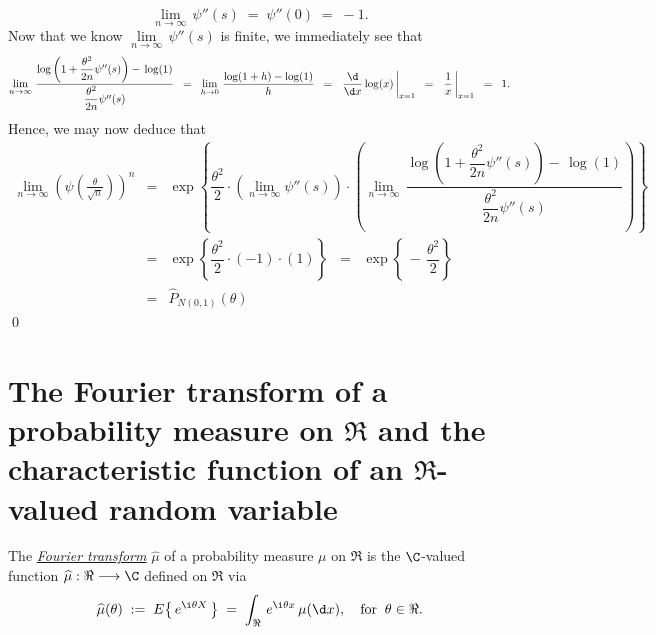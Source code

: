 \documentclass{article}
\begin{document}
\begin{equation*}
\lim_{n\rightarrow\infty}\,\psi''(s) \; = \; \psi''(0) \; = \; -1.
\end{equation*}
Now that we know $\underset{n\rightarrow\infty}{\lim}\,\psi''(s)$ is finite, we immediately see that
\begin{equation*}
\lim_{n\rightarrow\infty}\,\dfrac{\log\left(1+\dfrac{\theta^{2}}{2n}\psi''(s)\right)-\,\log(1)}{\dfrac{\theta^{2}}{2n}\psi''(s)}
\;\; = \;\; \lim_{h\rightarrow 0}\,\dfrac{\log(1+h)-\log(1)}{h}
\;\; = \;\; \left.\dfrac{\d}{\d x}\log(x)\,\right|_{x=1}
\;\; = \;\; \left.\dfrac{1}{x}\,\right|_{x=1}
\;\; = \;\; 1.
\end{equation*}
Hence, we may now deduce that
\begin{eqnarray*}
        \lim_{n\rightarrow\infty}\left(\psi\!\left(\frac{\theta}{\sqrt{n}}\right)\right)^{n}
&=& \exp\left\{\dfrac{\theta^{2}}{2}\cdot\left(\lim_{n\rightarrow\infty}\psi''(s)\right)\cdot\left(\lim_{n\rightarrow\infty}\,\dfrac{\log\left(1+\dfrac{\theta^{2}}{2n}\psi''(s)\right)-\,\log(1)}{\dfrac{\theta^{2}}{2n}\psi''(s)}\right)\right\} \\
&=& \exp\left\{\dfrac{\theta^{2}}{2}\cdot\left(-1\right)\cdot\left(1\right)\right\} 
\;\;=\;\; \exp\left\{\,-\,\dfrac{\theta^{2}}{2}\right\} \\
&=& \widehat{P}_{N(0,1)}(\theta)
\end{eqnarray*}
\qed


\appendix

\section{The Fourier transform of a probability measure on $\Re$ and the characteristic function of an $\Re$-valued random variable}
\setcounter{theorem}{0}

\begin{definition} \mbox{} \vskip 0.1cm \noindent
The \underline{\emph{Fourier transform}} $\widehat{\mu}$ of a probability measure $\mu$ on $\Re$ is the $\C$-valued function $\widehat{\mu} : \Re \longrightarrow \C$ defined on $\Re$ via
\begin{equation*}
\widehat{\mu}(\theta) \; := \; E\!\left\{\,e^{\i\theta X}\,\right\} \; = \; \int_{\Re} \, e^{\i\theta x} \, \mu(\d x),
\quad\textnormal{for}\;\; \theta \in \Re.
\end{equation*}
\end{definition}
\end{document}
